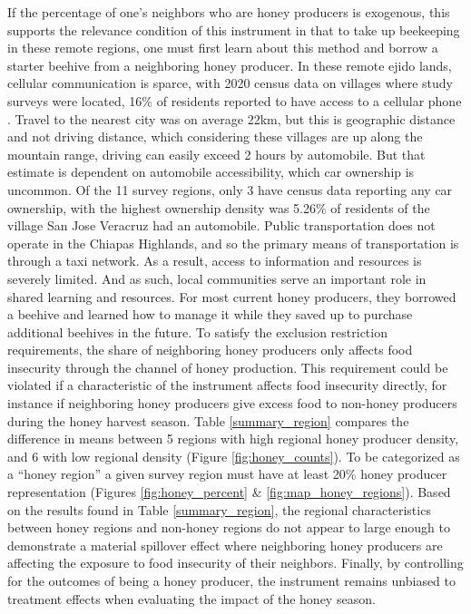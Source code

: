 \documentclass[../main.tex]{subfiles}
\begin{document}
If the percentage of one’s neighbors who are honey producers is exogenous, this supports the relevance condition of this instrument in that to take up beekeeping in these remote regions, one must first learn about this method and borrow a starter beehive from a neighboring honey producer. In these remote ejido lands, cellular communication is sparce, with 2020 census data on villages where study surveys were located, 16\% of residents reported to have access to a cellular phone \parencite{pueblos_america_towns_2020}. Travel to the nearest city was on average 22km, but this is geographic distance and not driving distance, which considering these villages are up along the mountain range, driving can easily exceed 2 hours by automobile. But that estimate is dependent on automobile accessibility, which car ownership is uncommon. Of the 11 survey regions, only 3 have census data reporting any car ownership, with the highest ownership density was 5.26\% of residents of the village San Jose Veracruz had an automobile. Public transportation does not operate in the Chiapas Highlands, and so the primary means of transportation is through a taxi network. As a result, access to information and resources is severely limited. And as such, local communities serve an important role in shared learning and resources. For most current honey producers, they borrowed a beehive and learned how to manage it while they saved up to purchase additional beehives in the future. 
To satisfy the exclusion restriction requirements, the share of neighboring honey producers only affects food insecurity through the channel of honey production. This requirement could be violated if a characteristic of the instrument affects food insecurity directly, for instance if neighboring honey producers give excess food to non-honey producers during the honey harvest season. Table \ref{summary_region} compares the difference in means between 5 regions with high regional honey producer density, and 6 with low regional density (Figure \ref{fig:honey_counts}). To be categorized as a “honey region” a given survey region must have at least 20\% honey producer representation (Figures \ref{fig:honey_percent} \& \ref{fig:map_honey_regions}). Based on the results found in Table \ref{summary_region}, the regional characteristics between honey regions and non-honey regions do not appear to large enough to demonstrate a material spillover effect where neighboring honey producers are affecting the exposure to food insecurity of their neighbors. Finally, by controlling for the outcomes of being a honey producer, the instrument remains unbiased to treatment effects when evaluating the impact of the honey season.
\end{document}
